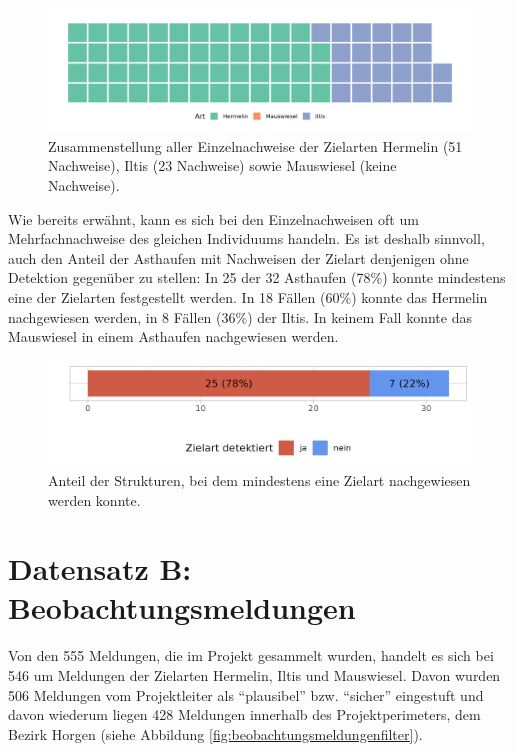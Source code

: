 \documentclass[
  oneside]{scrbook}
\begin{document}
\begin{figure}
\includegraphics[width=1\linewidth]{images/wirkungskontrolle_spontan_einzelnachweise_waffle} \caption{Zusammenstellung aller Einzelnachweise der Zielarten Hermelin (51 Nachweise), Iltis (23 Nachweise) sowie Mauswiesel (keine Nachweise).}\label{fig:wirkungskontrollespontaneinzelnachweisewaffle}
\end{figure}

Wie bereits erwähnt, kann es sich bei den Einzelnachweisen oft um Mehrfachnachweise des gleichen Individuums handeln. Es ist deshalb sinnvoll, auch den Anteil der Asthaufen mit Nachweisen der Zielart denjenigen ohne Detektion gegenüber zu stellen: In 25 der 32 Asthaufen (78\%) konnte mindestens eine der Zielarten festgestellt werden. In 18 Fällen (60\%) konnte das Hermelin nachgewiesen werden, in 8 Fällen (36\%) der Iltis. In keinem Fall konnte das Mauswiesel in einem Asthaufen nachgewiesen werden.



\begin{figure}
\includegraphics[width=1\linewidth]{images/wirkungskontrolle_spontan_strukturen_mit_zielart} \caption{Anteil der Strukturen, bei dem mindestens eine Zielart nachgewiesen werden konnte.}\label{fig:wirkungskontrollespontanstrukturenmitzielart}
\end{figure}

\hypertarget{datensatz-b-beobachtungsmeldungen}{%
\section{Datensatz B: Beobachtungsmeldungen}\label{datensatz-b-beobachtungsmeldungen}}

Von den 555 Meldungen, die im Projekt gesammelt wurden, handelt es sich bei 546 um Meldungen der Zielarten Hermelin, Iltis und Mauswiesel. Davon wurden 506 Meldungen vom Projektleiter als ``plausibel'' bzw. ``sicher'' eingestuft und davon wiederum liegen 428 Meldungen innerhalb des Projektperimeters, dem Bezirk Horgen (siehe Abbildung \ref{fig:beobachtungsmeldungenfilter}).
\end{document}
